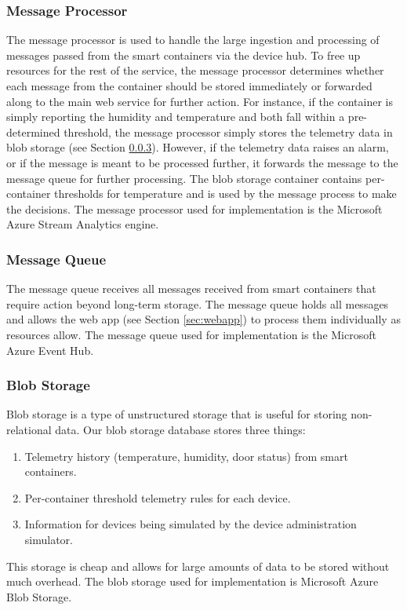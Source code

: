 \subsubsection{Message Processor}

The message processor is used to handle the large ingestion and processing of messages passed from the smart containers via the device hub. To free up resources for the rest of the service, the message processor determines whether each message from the container should be stored immediately or forwarded along to the main web service for further action. For instance, if the container is simply reporting the humidity and temperature and both fall within a pre-determined threshold, the message processor simply stores the telemetry data in blob storage (see Section \ref{sec:blob}). However, if the telemetry data raises an alarm, or if the message is meant to be processed further, it forwards the message to the message queue for further processing. The blob storage container contains per-container thresholds for temperature and is used by the message process to make the decisions. The message processor used for implementation is the Microsoft Azure Stream Analytics engine.

\subsubsection{Message Queue}

The message queue receives all messages received from smart containers that require action beyond long-term storage. The message queue holds all messages and allows the web app (see Section \ref{sec:webapp}) to process them individually as resources allow. The message queue used for implementation is the Microsoft Azure Event Hub. 

\subsubsection{Blob Storage} \label{sec:blob}

Blob storage is a type of unstructured storage that is useful for storing non-relational data. Our blob storage database stores three things:
\begin{enumerate}
    \item Telemetry history (temperature, humidity, door status) from smart containers.
    \item Per-container threshold telemetry rules for each device.
    \item Information for devices being simulated by the device administration simulator.
\end{enumerate}
This storage is cheap and allows for large amounts of data to be stored without much overhead. The blob storage used for implementation is Microsoft Azure Blob Storage.

